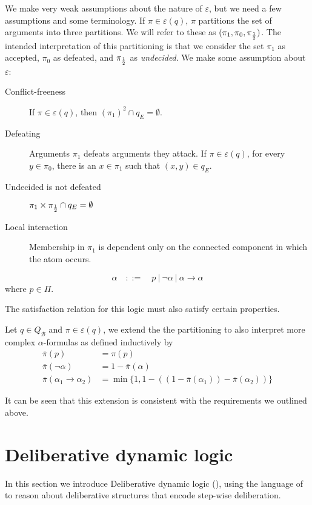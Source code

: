 \documentclass{llncs}
\newcommand{\carriers}[1]{Q_{#1}}
\newcommand{\views}{\mathcal B}
\newcommand{\sem}{\varepsilon}
\begin{document}
We make very weak assumptions about the nature of $\sem$, but we need a few assumptions and some terminology. If $\pi \in \sem(q)$, $\pi$ partitions the set of arguments into three partitions. We will refer to these as $(\pi_1, \pi_0, \pi_\frac 12)$. The intended interpretation of this partitioning is that we consider the set $\pi_1$ as accepted, $\pi_0$ as defeated, and $\pi_\frac 12$ as \emph{undecided}. We make some assumption about $\sem$: 
\begin{description}
\item[Conflict-freeness] If $\pi \in \sem(q)$, then $(\pi_1)^2 \cap q_E = \emptyset$.
\item[Defeating] Arguments $\pi_1$ defeats arguments they attack. If $\pi \in \sem(q)$, for every $y \in \pi_0$, there is an $x \in \pi_1$ such that $(x,y) \in q_E$.
\item[Undecided is not defeated] $\pi_1 \times \pi_\frac 12 \cap q_E = \emptyset$
\item[Local interaction] Membership in $\pi_1$ is dependent only on the connected component in which the atom occurs. 
\end{description}

$$ \alpha \quad ::= \quad p ~|~ \neg \alpha ~|~ \alpha \to \alpha $$
where $p \in \Pi$.

The satisfaction relation for this logic must also satisfy certain properties. 

\begin{definition} Let $q \in \carriers \views$ and $\pi \in \sem(q)$, we extend the the partitioning to also interpret more complex $\alpha$-formulas as defined inductively by
\begin{align*}
\overline\pi(p) &= \pi(p) \\
\overline\pi(\neg\alpha) &= 1 - \overline\pi(\alpha)\\
\overline\pi(\alpha_1 \to \alpha_2) &= \min \{1, 1 - ((1 - \overline\pi(\alpha_1)) - \overline\pi(\alpha_2))\} 
\end{align*}
\end{definition}
It can be seen that this extension is consistent with the requirements we outlined above. 

\section{Deliberative dynamic logic}\label{sec:ddl}

In this section we introduce Deliberative dynamic logic (), using the language of  to reason about deliberative structures that encode step-wise deliberation. 
\end{document}
